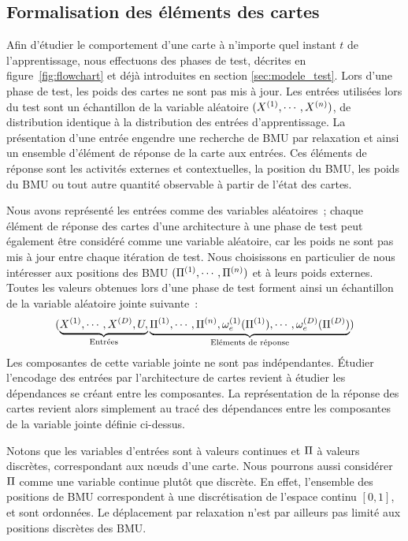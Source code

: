 \documentclass[../main]{subfiles}
\begin{document}
\subsection{Formalisation des éléments des cartes}

Afin d'étudier le comportement d'une carte à n'importe quel instant $t$ de l'apprentissage, nous effectuons des phases de test, décrites en figure~\ref{fig:flowchart} et déjà introduites en section \ref{sec:modele_test}. Lors d'une phase de test, les poids des cartes ne sont pas mis à jour. 
Les entrées utilisées lors du test sont un échantillon de la variable aléatoire $(X^{({1})}, \cdots, X^{({n})})$, de distribution identique à la distribution des entrées d'apprentissage.
La présentation d'une entrée engendre une recherche de BMU par relaxation et ainsi un ensemble d'élément de réponse de la carte aux entrées. Ces éléments de réponse sont les activités externes et contextuelles, la position du BMU, les poids du BMU ou tout autre quantité observable à partir de l'état des cartes.

Nous avons représenté les entrées comme des variables aléatoires~; chaque élément de réponse des cartes d'une architecture à une phase de test peut également être considéré comme une variable aléatoire, car les poids ne sont pas mis à jour entre chaque itération de test.
Nous choisissons en particulier de nous intéresser aux positions des BMU $(\Pi^{({1})}, \cdots, \Pi^{({n})})$ et à leurs poids externes.
Toutes les valeurs obtenues lors d'une phase de test forment ainsi un échantillon de la variable aléatoire jointe suivante~:
$$(\underbrace{X^{({1})}, \cdots, X^{({D})}, U,}_{\text{Entrées}} \underbrace{\Pi^{({1})}, \cdots, \Pi^{({n})}, \omega_e^{({1})}(\Pi^{({1})}), \cdots, \omega_e^{({D})}(\Pi^{({D})})}_{\text{Eléments de réponse}})$$
Les composantes de cette variable jointe ne sont pas indépendantes. \'Etudier l'encodage des entrées par l'architecture de cartes revient à étudier les dépendances se créant entre les composantes.
La représentation de la réponse des cartes revient alors simplement au tracé des dépendances entre les composantes de la variable jointe définie ci-dessus.


Notons que les variables d'entrées sont à valeurs continues et $\Pi$ à valeurs discrètes, correspondant aux n\oe{}uds d'une carte.
Nous pourrons aussi considérer $\Pi$ comme une variable continue plutôt que discrète.
En effet, l'ensemble des positions de BMU correspondent à une discrétisation de l'espace continu $[0,1]$, et sont ordonnées. Le déplacement par relaxation n'est par ailleurs pas limité aux positions discrètes des BMU.
\end{document}
